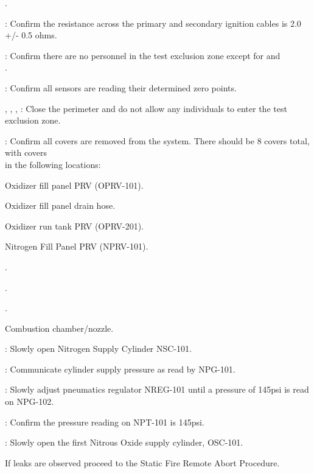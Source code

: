 \begin{checklist}
\begin{checklist}
        \item \oxinj{}.
    \end{checklist}
    \item \primary{}: Confirm the resistance across the primary and secondary ignition cables is 2.0 +/- 0.5 ohms. 
    \item \secondary{}: Confirm there are no personnel in the test exclusion zone except for \primary{} and \\ \phantom{} \hspace{3ex} \secondary{}.
    \item \daq{}: Confirm all sensors are reading their determined zero points. 
    \item \peri{}, \perii{}, \periii{}, \periv{}: Close the perimeter and do not allow any individuals to enter the test exclusion zone.
    \item \primary{}: Confirm all covers are removed from the system. There should be 8 covers total, with covers \\ \phantom{} \hspace{3ex} in the following locations:
    \begin{checklist}
        \item Oxidizer fill panel PRV (OPRV-101).
        \item Oxidizer fill panel drain hose.
        \item Oxidizer run tank PRV (OPRV-201).
        \item Nitrogen Fill Panel PRV (NPRV-101).
        \item \vent{}.
        \item \pdrain{}.
        \item \fdrain{}.
        \item Combustion chamber/nozzle.
    \end{checklist}
    \item \primary{}: Slowly open Nitrogen Supply Cylinder NSC-101. 
    \item \primary{}: Communicate cylinder supply pressure as read by NPG-101. 
    \item \primary{}: Slowly adjust pneumatics regulator NREG-101 until a pressure of 145psi is read on NPG-102.
    \item \daq{}: Confirm the pressure reading on NPT-101 is 145psi. 
    \item \primary{}: Slowly open the first Nitrous Oxide supply cylinder, OSC-101. 
     \begin{checklist}[label=$\bullet$]
        \item If leaks are observed proceed to the Static Fire Remote Abort Procedure. 

\end{checklist}
\end{checklist}
